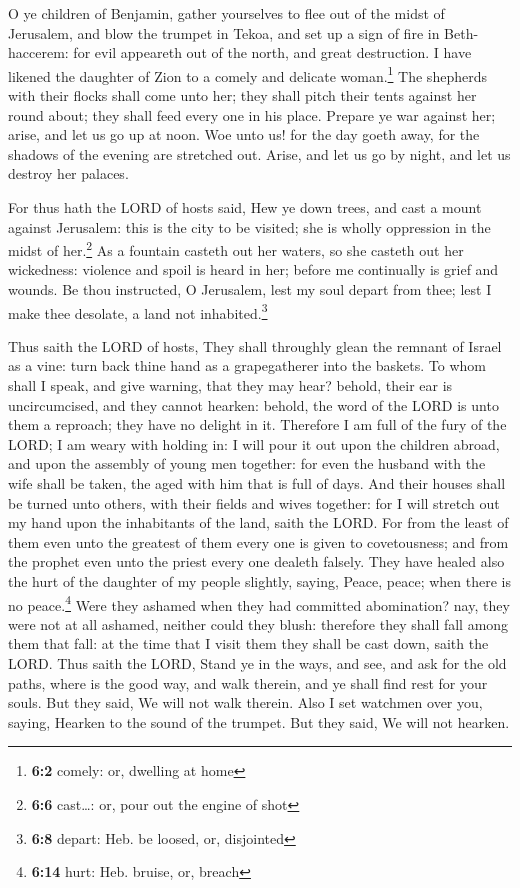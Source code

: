  O ye children of Benjamin, gather yourselves to flee out
of the midst of Jerusalem, and blow the trumpet in Tekoa, and set up a
sign of fire in Beth-haccerem: for evil appeareth out of the north, and
great destruction.  I have likened the daughter of Zion to
a comely and delicate woman.\footnote{\textbf{6:2} comely: or, dwelling
  at home}  The shepherds with their flocks shall come
unto her; they shall pitch their tents against her round about; they
shall feed every one in his place.  Prepare ye war against
her; arise, and let us go up at noon. Woe unto us! for the day goeth
away, for the shadows of the evening are stretched out. 
Arise, and let us go by night, and let us destroy her palaces.

 For thus hath the LORD of hosts said, Hew ye down trees,
and cast a mount against Jerusalem: this is the city to be visited; she
is wholly oppression in the midst of her.\footnote{\textbf{6:6}
  cast\ldots: or, pour out the engine of shot}  As a
fountain casteth out her waters, so she casteth out her wickedness:
violence and spoil is heard in her; before me continually is grief and
wounds.  Be thou instructed, O Jerusalem, lest my soul
depart from thee; lest I make thee desolate, a land not
inhabited.\footnote{\textbf{6:8} depart: Heb. be loosed, or, disjointed}

 Thus saith the LORD of hosts, They shall throughly glean
the remnant of Israel as a vine: turn back thine hand as a grapegatherer
into the baskets.  To whom shall I speak, and give
warning, that they may hear? behold, their ear is uncircumcised, and
they cannot hearken: behold, the word of the LORD is unto them a
reproach; they have no delight in it.  Therefore I am
full of the fury of the LORD; I am weary with holding in: I will pour it
out upon the children abroad, and upon the assembly of young men
together: for even the husband with the wife shall be taken, the aged
with him that is full of days.  And their houses shall be
turned unto others, with their fields and wives together: for I will
stretch out my hand upon the inhabitants of the land, saith the LORD.
 For from the least of them even unto the greatest of
them every one is given to covetousness; and from the prophet even unto
the priest every one dealeth falsely.  They have healed
also the hurt of the daughter of my people slightly, saying, Peace,
peace; when there is no peace.\footnote{\textbf{6:14} hurt: Heb. bruise,
  or, breach}  Were they ashamed when they had committed
abomination? nay, they were not at all ashamed, neither could they
blush: therefore they shall fall among them that fall: at the time that
I visit them they shall be cast down, saith the LORD. 
Thus saith the LORD, Stand ye in the ways, and see, and ask for the old
paths, where is the good way, and walk therein, and ye shall find rest
for your souls. But they said, We will not walk therein. 
Also I set watchmen over you, saying, Hearken to the sound of the
trumpet. But they said, We will not hearken.

